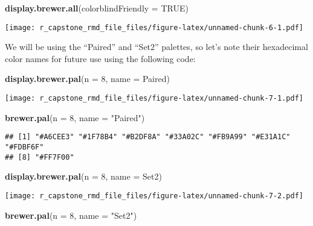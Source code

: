 \documentclass[
]{article}
\newenvironment{Shaded}{\begin{snugshade}}{\end{snugshade}}
\newcommand{\AttributeTok}[1]{\textcolor[rgb]{0.13,0.29,0.53}{#1}}
\newcommand{\ConstantTok}[1]{\textcolor[rgb]{0.56,0.35,0.01}{#1}}
\newcommand{\DecValTok}[1]{\textcolor[rgb]{0.00,0.00,0.81}{#1}}
\newcommand{\FunctionTok}[1]{\textcolor[rgb]{0.13,0.29,0.53}{\textbf{#1}}}
\newcommand{\NormalTok}[1]{#1}
\newcommand{\StringTok}[1]{\textcolor[rgb]{0.31,0.60,0.02}{#1}}
\begin{document}
\begin{Shaded}
\begin{Highlighting}[]
\FunctionTok{display.brewer.all}\NormalTok{(}\AttributeTok{colorblindFriendly =} \ConstantTok{TRUE}\NormalTok{)}
\end{Highlighting}
\end{Shaded}

\texttt{[image: r\_capstone\_rmd\_file\_files/figure-latex/unnamed-chunk-6-1.pdf]}

We will be using the ``Paired'' and ``Set2'' palettes, so let's note
their hexadecimal color names for future use using the following code:

\begin{Shaded}
\begin{Highlighting}[]
\FunctionTok{display.brewer.pal}\NormalTok{(}\AttributeTok{n =} \DecValTok{8}\NormalTok{, }\AttributeTok{name =} \StringTok{\textquotesingle{}Paired\textquotesingle{}}\NormalTok{)}
\end{Highlighting}
\end{Shaded}

\texttt{[image: r\_capstone\_rmd\_file\_files/figure-latex/unnamed-chunk-7-1.pdf]}

\begin{Shaded}
\begin{Highlighting}[]
\FunctionTok{brewer.pal}\NormalTok{(}\AttributeTok{n =} \DecValTok{8}\NormalTok{, }\AttributeTok{name =} \StringTok{"Paired"}\NormalTok{)}
\end{Highlighting}
\end{Shaded}

\begin{verbatim}
## [1] "#A6CEE3" "#1F78B4" "#B2DF8A" "#33A02C" "#FB9A99" "#E31A1C" "#FDBF6F"
## [8] "#FF7F00"
\end{verbatim}

\begin{Shaded}
\begin{Highlighting}[]
\FunctionTok{display.brewer.pal}\NormalTok{(}\AttributeTok{n =} \DecValTok{8}\NormalTok{, }\AttributeTok{name =} \StringTok{\textquotesingle{}Set2\textquotesingle{}}\NormalTok{)}
\end{Highlighting}
\end{Shaded}

\texttt{[image: r\_capstone\_rmd\_file\_files/figure-latex/unnamed-chunk-7-2.pdf]}

\begin{Shaded}
\begin{Highlighting}[]
\FunctionTok{brewer.pal}\NormalTok{(}\AttributeTok{n =} \DecValTok{8}\NormalTok{, }\AttributeTok{name =} \StringTok{"Set2"}\NormalTok{)}
\end{Highlighting}
\end{Shaded}
\end{document}
